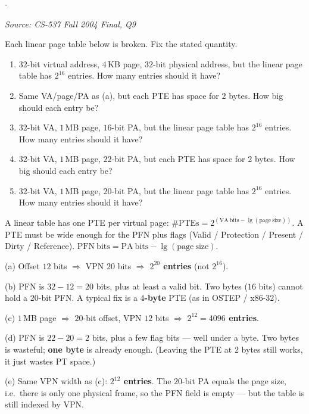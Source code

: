 \documentclass[11pt,a4paper]{article}
\makeatletter
\newcommand{\keepspace}[1]{\par\penalty-100\begingroup
  \setlength{\dimen@}{#1}\dimen@ii\pagegoal\advance\dimen@ii-\pagetotal
  \ifdim\dimen@>\dimen@ii\ifdim\dimen@ii>\z@\vfil\fi\break\fi\endgroup}
\newcounter{qn}[section]
\newenvironment{Qn}[4]{%
  \refstepcounter{qn}\keepspace{7\baselineskip}%
  \begin{tcolorbox}[qboxstyle, title={Q\thesection.\theqn\ \ [#1 \textbar\ #2]\ \ #4}]%
  {\footnotesize\color{g3}\textit{Source: #3}}\par\smallskip%
}{%
  \end{tcolorbox}%
}
\newenvironment{Sol}{%
  \begin{tcolorbox}[sboxstyle, title={Solution}]%
}{%
  \end{tcolorbox}\vspace{0.35em}%
}
\makeatother
\begin{document}
\begin{Qn}{Medium-Hard}{Lect 12}{CS-537 Fall 2004 Final, Q9}{The linear page tables are the wrong size --- fix them}
Each linear page table below is broken. Fix the stated quantity.
\begin{enumerate}
  \item[(a)] $32$-bit virtual address, $4$\,KB page, $32$-bit physical
        address, but the linear page table has $2^{16}$ entries. How
        many entries should it have?
  \item[(b)] Same VA/page/PA as (a), but each PTE has space for $2$
        bytes. How big should each entry be?
  \item[(c)] $32$-bit VA, $1$\,MB page, $16$-bit PA, but the linear
        page table has $2^{16}$ entries. How many entries should it
        have?
  \item[(d)] $32$-bit VA, $1$\,MB page, $22$-bit PA, but each PTE has
        space for $2$ bytes. How big should each entry be?
  \item[(e)] $32$-bit VA, $1$\,MB page, $20$-bit PA, but the linear
        page table has $2^{16}$ entries. How many entries should it
        have?
\end{enumerate}
\end{Qn}
\begin{Sol}
A linear table has one PTE per virtual page:
$\#\mathrm{PTEs}=2^{(\mathrm{VA\ bits}-\lg(\mathrm{page\ size}))}$.
A PTE must be wide enough for the PFN plus flags
(Valid / Protection / Present / Dirty / Reference).
$\mathrm{PFN\ bits}=\mathrm{PA\ bits}-\lg(\mathrm{page\ size})$.

(a) Offset $12$ bits $\Rightarrow$ VPN $20$ bits $\Rightarrow$
\textbf{$2^{20}$ entries} (not $2^{16}$).

(b) PFN is $32-12=20$ bits, plus at least a valid bit. Two bytes
($16$ bits) cannot hold a $20$-bit PFN. A typical fix is a
\textbf{$4$-byte} PTE (as in OSTEP / x86-32).

(c) $1$\,MB page $\Rightarrow$ $20$-bit offset, VPN $12$ bits
$\Rightarrow$ \textbf{$2^{12}=4096$ entries}.

(d) PFN is $22-20=2$ bits, plus a few flag bits --- well under a
byte. Two bytes is wasteful; \textbf{one byte} is already enough.
(Leaving the PTE at $2$ bytes still works, it just wastes PT space.)

(e) Same VPN width as (c): \textbf{$2^{12}$ entries}. The $20$-bit
PA equals the page size, i.e.\ there is only one physical frame, so
the PFN field is empty --- but the table is still indexed by VPN.
\end{Sol}
\end{document}
